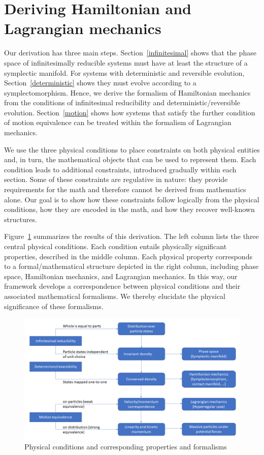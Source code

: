 \documentclass[12pt, twoside]{article}
\begin{document}
\section{Deriving Hamiltonian and Lagrangian mechanics}
\label{derivation}

Our derivation has three main steps. Section~\ref{infinitesimal} shows that the phase space of infinitesimally reducible systems must have at least the structure of a symplectic manifold. For systems with deterministic and reversible evolution, Section~\ref{deterministic} shows they must evolve according to a symplectomorphism. Hence, we derive the formalism of Hamiltonian mechanics from the conditions of infinitesimal reducibility and deterministic/reversible evolution. Section~\ref{motion} shows how systems that satisfy the further condition of motion equivalence can be treated within the formalism of Lagrangian mechanics. 

We use the three physical conditions to place constraints on both physical entities and, in turn, the mathematical objects that can be used to represent them. Each condition leads to additional constraints, introduced gradually within each section.  Some of these constraints are regulative in nature: they provide requirements for the math and therefore cannot be derived from mathematics alone. Our goal is to show how these constraints follow logically from the physical conditions, how they are encoded in the math, and how they recover well-known structures.

Figure~\ref{diagram} summarizes the results of this derivation. The left column lists the three central physical conditions. Each condition entails physically significant properties, described in the middle column. Each physical property corresponds to a formal/mathematical structure depicted in the right column, including phase space, Hamiltonian mechanics, and Lagrangian mechanics. In this way, our framework develops a correspondence between physical conditions and their associated mathematical formalisms. We thereby elucidate the physical significance of these formalisms.

\begin{figure}[h]
	\centering
	\includegraphics[width=\textwidth]{Diagram.png}
\caption{Physical conditions and corresponding properties and formalisms}
\label{diagram}
\end{figure}
\end{document}
